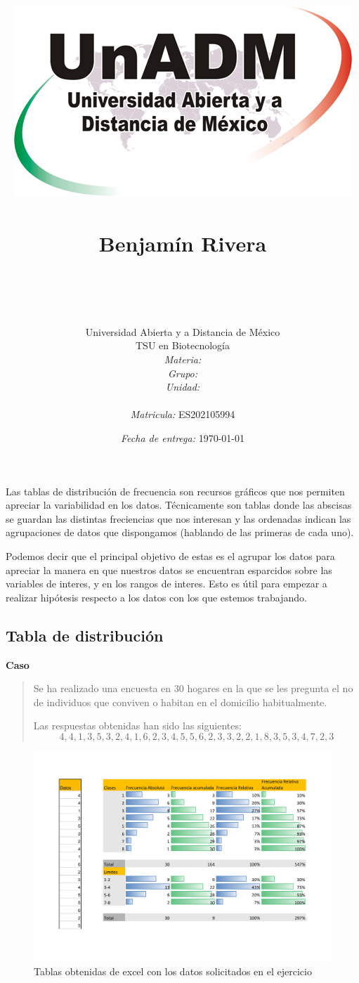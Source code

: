 \documentclass[12pt]{article}
\title{
	\includegraphics{../../../assets/logo-unadm} \\
	\ \\ Benjam\'in Rivera \\
	\bf{\titulo}\\\ \\}
\author{
	Universidad Abierta y a Distancia de México \\
	TSU en Biotecnolog\'ia \\
	\textit{Materia:} \materia \\
	\textit{Grupo:} \grupo \\
	\textit{Unidad:} \unidad \\
	\\
	\textit{Matricula:} ES202105994 }
\date{\textit{Fecha de entrega:} \today}
\begin{document}
\maketitle\newpage

	\par Las tablas de distribución de frecuencia son recursos gráficos que nos permiten apreciar la variabilidad en los datos. Técnicamente son tablas donde las abscisas se guardan las distintas freciencias que nos interesan y las ordenadas indican las agrupaciones de datos que dispongamos (hablando de las primeras de cada uno).

 \par Podemos decir que el principal objetivo de estas es el agrupar los datos para apreciar la manera en que nuestros datos se encuentran esparcidos sobre las variables de interes, y en los rangos de interes. Esto es útil para empezar a realizar hipótesis respecto a los datos con los que estemos trabajando.



\subsection*{Tabla de distribuci\'on}

\textbf{Caso}
	\begin{quote}
		Se ha realizado una encuesta en 30 hogares en la que se les pregunta el no de individuos que conviven o habitan en el domicilio habitualmente.

	Las respuestas obtenidas han sido las siguientes:
	$$4, 4, 1, 3, 5, 3, 2, 4, 1, 6, 2, 3, 4, 5, 5, 6, 2, 3, 3, 2, 2, 1, 8, 3, 5, 3, 4, 7, 2, 3$$
	\end{quote}
	\begin{figure}[h]
	\centering
		\includegraphics[width=1\textwidth]{Book1.png}
	\caption{Tablas obtenidas de excel con los datos solicitados en el ejercicio}
	\label{fig: tabla}
\end{figure}
\end{document}
